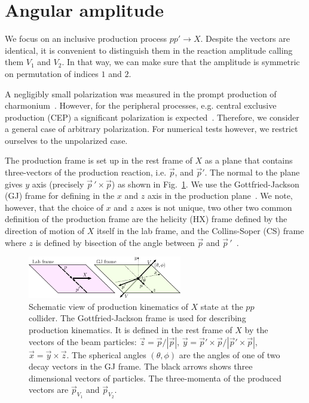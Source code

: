 \documentclass[prd,preprintnumbers,floatfix,
nofootinbib,superscriptaddress]{revtex4}
\begin{document}
\section{Angular amplitude} \label{sec:reaction.amplitude}
We focus on an inclusive production process $p p'\to X$.
Despite the vectors are identical, it is convenient to distinguish them in the
reaction amplitude calling them $V_1$ and $V_2$. In that way, we can make sure that the amplitude
is symmetric on permutation of indices $1$ and $2$.

A negligibly small polarization was measured in the prompt production of charmonium~\cite{Aaij:2013nlm,Chatrchyan:2012woa,CDF:2011ag, Aaij:2013oxa,Sirunyan:2018bfd}.
However, for the peripheral processes, e.g. central exclusive production (CEP) a significant polarization is expected~\cite{Pasechnik:2010pq}.
Therefore, we consider a general case of arbitrary polarization.
For numerical tests however, we restrict ourselves to the unpolarized case.

The production frame is set up in the rest frame of $X$ as a plane that contains three-vectors of the
production reaction, i.e. $\vec p$, and $\vec p'$. The normal to the plane gives $y$ axis (precisely $\vec p\,'\times \vec p$) as shown in Fig.~\ref{fig:production}.
We use the Gottfried-Jackson (GJ) frame for defining in the $x$ and $z$ axis in the production plane~\cite{Gottfried:1964nx}.
We note, however, that the choice of $x$ and $z$ axes is not unique, two other two common definition of the production frame are the helicity (HX) frame
defined by the direction of motion of $X$ itself in the lab frame, and the Collins-Soper (CS) frame where $z$ is defined by bisection of the angle between $\vec p$ and $\vec p\,'$~\cite{Faccioli:2010kd}.
\begin{figure}
  \includegraphics[width=0.6\textwidth]{../plots/production_GJ.pdf}
  \caption{Schematic view of production kinematics of $X$ state at the $pp$ collider.
  The Gottfried-Jackson frame is used for describing production kinematics.
  It is defined in the rest frame of $X$ by the vectors of the beam particles:
  $\vec z = \vec p / |\vec p|$, $\vec y = \vec p' \times \vec p / |\vec p' \times \vec p|$, $\vec x = \vec y \times \vec z$.
  The spherical angles $(\theta,\phi)$ are the angles of one of two decay vectors in the GJ frame.
  The black arrows shows three dimensional vectors of particles.
  The three-momenta of the produced vectors are $\vec p_{V_1}$ and $\vec p_{V_2}$.
  }
  \label{fig:production}
\end{figure}
\end{document}
